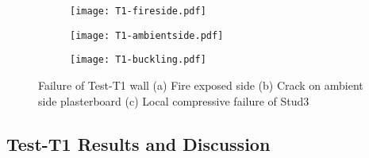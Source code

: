 \begin{figure}[!htbp]
	\centering
	\begin{subfigure}[b]{0.3\textwidth}
		\centering
		\texttt{[image: T1-fireside.pdf]}
		\caption{}
		\label{subfig:T1-fireside}
	\end{subfigure}
	\begin{subfigure}[b]{0.3\textwidth}
		\centering
		\texttt{[image: T1-ambientside.pdf]}
		\caption{}
		\label{subfig:T1-ambientside}
	\end{subfigure}
	\begin{subfigure}[b]{0.3\textwidth}
		\centering
		\texttt{[image: T1-buckling.pdf]}
		\caption{}
		\label{subfig:T1-buckling}
	\end{subfigure}
	   \caption{Failure of Test-T1 wall (a) Fire exposed side (b) Crack on ambient side plasterboard (c) Local compressive failure of Stud3}
	   \label{fig:T1-failure}
\end{figure}

\subsection{Test-T1 Results and Discussion}

